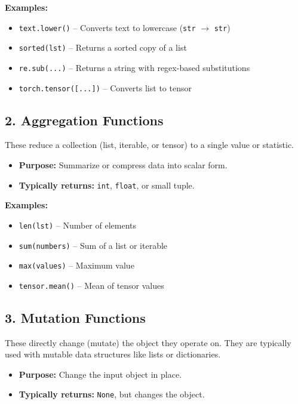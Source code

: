 \textbf{Examples:}

\begin{itemize}
	\item \texttt{text.lower()} – Converts text to lowercase (\texttt{str} $\rightarrow$ \texttt{str})
	\item \texttt{sorted(lst)} – Returns a sorted copy of a list
	\item \texttt{re.sub(...)} – Returns a string with regex-based substitutions
	\item \texttt{torch.tensor([...])} – Converts list to tensor
\end{itemize}

\subsection*{2. Aggregation Functions}

These reduce a collection (list, iterable, or tensor) to a single value or statistic.

\begin{itemize}
	\item \textbf{Purpose:} Summarize or compress data into scalar form.
	\item \textbf{Typically returns:} \texttt{int}, \texttt{float}, or small tuple.
\end{itemize}

\textbf{Examples:}

\begin{itemize}
	\item \texttt{len(lst)} – Number of elements
	\item \texttt{sum(numbers)} – Sum of a list or iterable
	\item \texttt{max(values)} – Maximum value
	\item \texttt{tensor.mean()} – Mean of tensor values
\end{itemize}

\subsection*{3. Mutation Functions}

These directly change (mutate) the object they operate on. They are typically used with mutable data structures like lists or dictionaries.

\begin{itemize}
	\item \textbf{Purpose:} Change the input object in place.
	\item \textbf{Typically returns:} \texttt{None}, but changes the object.
\end{itemize}

